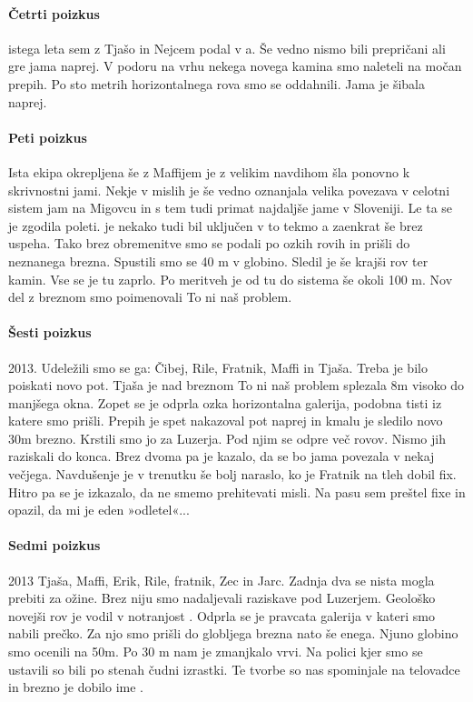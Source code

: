 \paragraph{Četrti poizkus} istega leta sem z Tjašo in Nejcem podal v a. Še vedno nismo bili prepričani ali gre jama naprej. V podoru na vrhu nekega novega kamina smo naleteli na močan prepih. Po sto metrih horizontalnega rova smo se oddahnili. Jama je šibala naprej. 

\paragraph{Peti poizkus} Ista ekipa okrepljena še z Maffijem je z velikim navdihom šla ponovno k skrivnostni jami. Nekje v mislih je še vedno oznanjala velika povezava v celotni sistem jam na Migovcu in s tem tudi primat najdaljše jame v Sloveniji. Le ta se je zgodila  poleti.  je nekako tudi bil uključen v to tekmo a zaenkrat še brez uspeha. Tako brez obremenitve smo se podali po ozkih rovih in prišli do neznanega brezna.  Spustili smo se 40 m v globino. Sledil je še krajši rov ter kamin. Vse se je tu zaprlo. Po meritveh je od tu do sistema še okoli 100 m. Nov del z breznom smo poimenovali To ni naš problem. 

\paragraph{Šesti poizkus} 2013. Udeležili smo se ga: Čibej, Rile, Fratnik, Maffi in Tjaša. Treba je bilo poiskati novo pot. Tjaša je nad breznom To ni naš problem splezala 8m visoko do manjšega okna. Zopet se je odprla ozka horizontalna galerija, podobna tisti iz katere smo prišli. Prepih je spet nakazoval pot naprej in kmalu je sledilo novo 30m brezno. Krstili smo jo za Luzerja. Pod njim se odpre več rovov. Nismo jih raziskali do konca. Brez dvoma pa je kazalo, da se bo jama povezala v nekaj večjega. Navdušenje je v trenutku še bolj naraslo, ko je Fratnik na tleh dobil fix. Hitro pa se je izkazalo, da ne smemo prehitevati misli. Na pasu sem preštel  fixe  in opazil, da  mi je eden »odletel«... 

\paragraph{Sedmi poizkus} 2013 Tjaša, Maffi, Erik, Rile, fratnik, Zec in Jarc. Zadnja dva se nista mogla prebiti za ožine. Brez niju smo nadaljevali raziskave pod Luzerjem. Geološko novejši rov je vodil v notranjost . Odprla se je pravcata galerija v kateri smo nabili prečko. Za njo smo prišli do globljega brezna nato še enega. Njuno globino smo ocenili na 50m. Po 30 m nam je zmanjkalo vrvi. Na polici kjer smo se ustavili so bili po stenah čudni izrastki. Te tvorbe so nas spominjale na telovadce in brezno je dobilo ime .

